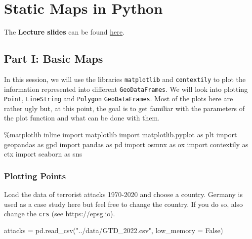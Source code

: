 \documentclass[
  letterpaper,
  DIV=11,
  numbers=noendperiod]{scrreprt}
\newenvironment{Shaded}{\begin{snugshade}}{\end{snugshade}}
\newcommand{\ImportTok}[1]{\textcolor[rgb]{0.00,0.46,0.62}{#1}}
\newcommand{\NormalTok}[1]{\textcolor[rgb]{0.00,0.23,0.31}{#1}}
\newcommand{\OperatorTok}[1]{\textcolor[rgb]{0.37,0.37,0.37}{#1}}
\newcommand{\StringTok}[1]{\textcolor[rgb]{0.13,0.47,0.30}{#1}}
\newcommand{\VariableTok}[1]{\textcolor[rgb]{0.07,0.07,0.07}{#1}}
\begin{document}

\chapter{Static Maps in Python}\label{static-maps-in-python}

The \textbf{Lecture slides} can be found
\href{https://github.com/GDSL-UL/wma/raw/main/html/w02.html}{here}.

\section{Part I: Basic Maps}\label{part-i-basic-maps}

In this session, we will use the libraries \texttt{matplotlib} and
\texttt{contextily} to plot the information represented into different
\texttt{GeoDataFrames}. We will look into plotting \texttt{Point},
\texttt{LineString} and \texttt{Polygon} \texttt{GeoDataFrames}. Most of
the plots here are rather ugly but, at this point, the goal is to get
familiar with the parameters of the plot function and what can be done
with them.

\begin{Shaded}
\begin{Highlighting}[]
\OperatorTok{\%}\NormalTok{matplotlib inline}
\ImportTok{import}\NormalTok{ matplotlib}
\ImportTok{import}\NormalTok{ matplotlib.pyplot }\ImportTok{as}\NormalTok{ plt}
\ImportTok{import}\NormalTok{ geopandas }\ImportTok{as}\NormalTok{ gpd}
\ImportTok{import}\NormalTok{ pandas }\ImportTok{as}\NormalTok{ pd}
\ImportTok{import}\NormalTok{ osmnx }\ImportTok{as}\NormalTok{ ox}
\ImportTok{import}\NormalTok{ contextily }\ImportTok{as}\NormalTok{ ctx}
\ImportTok{import}\NormalTok{ seaborn }\ImportTok{as}\NormalTok{ sns}
\end{Highlighting}
\end{Shaded}

\subsection{Plotting Points}\label{plotting-points}

Load the data of terrorist attacks 1970-2020 and choose a country.
Germany is used as a case study here but feel free to change the
country. If you do so, also change the \texttt{crs} (see
https://epsg.io).

\begin{Shaded}
\begin{Highlighting}[]
\NormalTok{attacks }\OperatorTok{=}\NormalTok{ pd.read\_csv(}\StringTok{"../data/GTD\_2022.csv"}\NormalTok{, low\_memory }\OperatorTok{=} \VariableTok{False}\NormalTok{)}
\end{Highlighting}
\end{Shaded}
\end{document}
